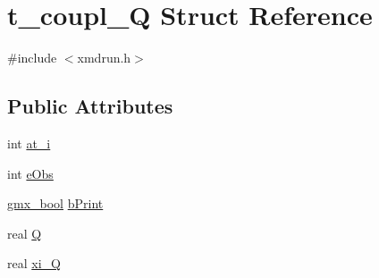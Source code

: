 \hypertarget{structt__coupl__Q}{\section{t\-\_\-coupl\-\_\-\-Q \-Struct \-Reference}
\label{structt__coupl__Q}
}


{\ttfamily \#include $<$xmdrun.\-h$>$}

\subsection*{\-Public \-Attributes}
\begin{DoxyCompactItemize}
\item 
int \hyperlink{structt__coupl__Q_aa4ea26bc64ba2a5e8ac539c7f03a65bc}{at\-\_\-i}
\item 
int \hyperlink{structt__coupl__Q_ac7565c7acf8ff030537fa1162ddd913e}{e\-Obs}
\item 
\hyperlink{include_2types_2simple_8h_a8fddad319f226e856400d190198d5151}{gmx\-\_\-bool} \hyperlink{structt__coupl__Q_a46026c5d36ddcdb8a6fc237105c7abf7}{b\-Print}
\item 
real \hyperlink{structt__coupl__Q_aa606d5de8591277ef87f8e4d28be918a}{\-Q}
\item 
real \hyperlink{structt__coupl__Q_ab2e34524a04200c939791d291b54957d}{xi\-\_\-\-Q}
\end{DoxyCompactItemize}



